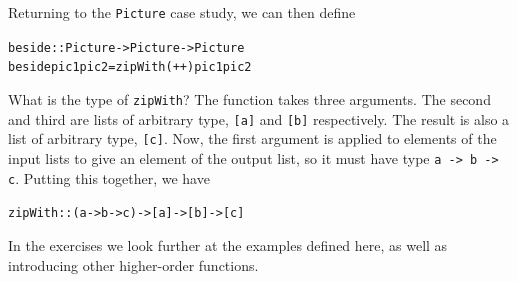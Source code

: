 Returning to the \texttt{Picture} case study, we can then define
\begin{alltt}
beside :: Picture -> Picture -> Picture
beside pic1 pic2 = zipWith (++) pic1 pic2
\end{alltt}
What is the type of \texttt{zipWith}?
The function takes three arguments. The second and third are lists of
arbitrary type, \texttt{[a]} and \texttt{[b]} respectively. The result is also
a list of arbitrary type, \texttt{[c]}. Now, the first argument is
applied to elements of the input lists to give an element of the output
list, so it must have type
\texttt{a -> b -> c}. Putting this together, we have
\begin{alltt}
zipWith :: (a -> b -> c) -> [a] -> [b] -> [c]
\end{alltt}

In the exercises we look further at the examples defined here, as well
as introducing other higher-order functions.

